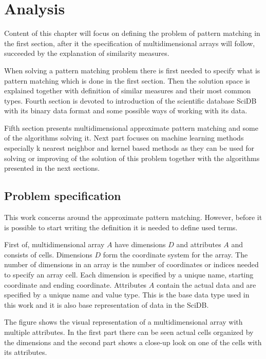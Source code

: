 \chapter{Analysis}
Content of this chapter will focus on defining the problem of pattern matching in the first section, after it the specification of multidimensional arrays will follow, succeeded by the explanation of similarity measures. 

When solving a pattern matching problem there is first needed to specify what is pattern matching which is done in the first section. Then the solution space is explained together with definition of similar measures and their most common types. Fourth section is devoted to introduction of the scientific database SciDB with its binary data format and some possible ways of working with its data.

Fifth section presents multidimensional approximate pattern matching and some of the algorithms solving it. Next part focuses on machine learning methods especially k nearest neighbor and kernel based methods as they can be used for solving or improving of the solution of this problem together with the algorithms presented in the next sections.
\section{Problem specification}
This work concerns around the approximate pattern matching. However, before it is possible to start writing the definition it is needed to define used terms.

First of,
multidimensional array $A$ have dimensions $D$ and attributes $A$ and consists of cells. Dimensions $D$ form the coordinate system for the array. The number of dimensions in an array is the number of coordinates or indices needed to specify an array cell. Each dimension is specified by a unique name, starting coordinate and ending coordinate. Attributes $A$ contain the actual data and are specified by a unique name and value type. \cite{scidb} This is the base data type used in this work and it is also base representation of data in the SciDB.

The figure shows the visual representation of a multidimensional array with multiple attributes. In the first part there can be seen actual cells organized by the dimensions and the second part shows a close-up look on one of the cells with its attributes.

